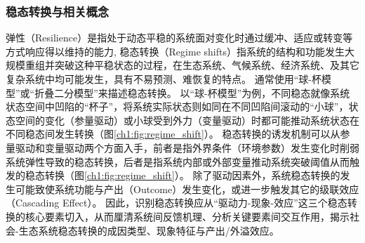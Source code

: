 
\subsubsection{稳态转换与相关概念}

弹性（Resilience）是指处于动态平稳的系统面对变化时通过缓冲、适应或转变等方式响应得以维持的能力\cite{folke2010}, 稳态转换（Regime shifts）指系统的结构和功能发生大规模重组并突破这种平稳状态的过程\cite{scheffer2001}，在生态系统、气候系统、经济系统、及其它复杂系统中均可能发生，具有不易预测、难恢复的特点\cite{scheffer2003, biggs2009}。
通常使用“球-杯模型”或“折叠二分模型”来描述稳态转换。
以“球-杯模型”为例，不同稳态就像系统状态空间中凹陷的“杯子”，将系统实际状态则如同在不同凹陷间滚动的“小球”，状态空间的变化（参量驱动）或小球受到外力（变量驱动）时都可能推动系统状态在不同稳态间发生转换\cite{scheffer2009, folke2010}（图\ref{ch1:fig:regime_shift}）。
稳态转换的诱发机制可以从参量驱动和变量驱动两个方面入手，前者是指外界条件（环境参数）发生变化时削弱系统弹性导致的稳态转换，后者是指系统内部或外部变量推动系统突破阈值从而触发的稳态转换\cite{scheffer2009, folke2010}（图\ref{ch1:fig:regime_shift}）。
除了驱动因素外，系统稳态转换的发生可能致使系统功能与产出（Outcome）发生变化，或进一步触发其它的级联效应（Cascading Effect）\cite{rocha2018}。
因此，识别稳态转换应从“驱动力-现象-效应”这三个稳态转换的核心要素切入，从而厘清系统间反馈机理、分析关键要素间交互作用，揭示社会-生态系统稳态转换的成因类型、现象特征与产出/外溢效应。

